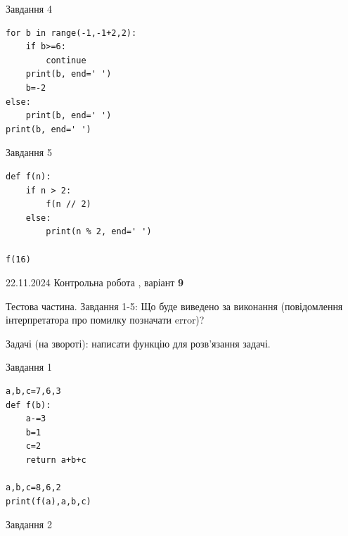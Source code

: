 \documentclass[12pt, ukrainian]{article}
\begin{document}
{{{{{{{{\begin{minipage}[t]{10.7cm}
{\begin{center}Завдання {4}\end{center}}
\vspace{-6mm}

\begin{verbatim}
for b in range(-1,-1+2,2):
    if b>=6:
        continue
    print(b, end=' ')
    b=-2
else:
    print(b, end=' ')
print(b, end=' ')
\end{verbatim}


\vspace{5mm}
               
{\begin{center}Завдання {5}\end{center}}
\vspace{-6mm}

\begin{verbatim}
def f(n):
    if n > 2:
        f(n // 2)
    else:
        print(n % 2, end=' ')

f(16)
\end{verbatim}


\end{minipage}

\newpage

{{22.11.2024 Контрольна робота , варіант  \No \textbf { 9 }\par}}
{

Тестова частина. Завдання 1-5: Що буде виведено за виконання (повідомлення інтерпретатора про помилку позначати error)?

Задачі (на звороті): написати функцію для розв'язання задачі.

\vspace{5mm} \begin{minipage}[t]{8.5cm}
               
{\begin{center}Завдання {1}\end{center}}
\vspace{-6mm}

\begin{verbatim}
a,b,c=7,6,3
def f(b):
    a-=3
    b=1
    c=2
    return a+b+c

a,b,c=8,6,2
print(f(a),a,b,c)
\end{verbatim}


\vspace{5mm}
               
{\begin{center}Завдання {2}\end{center}}
\vspace{-6mm}


\end{minipage}}}}}}}}}}
\end{document}
